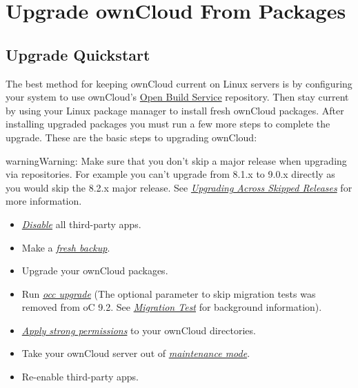 \documentclass[letterpaper,10pt,english]{sphinxmanual}
\begin{document}
\section{Upgrade ownCloud From Packages}
\label{maintenance/package_upgrade:upgrade-owncloud-from-packages}\label{maintenance/package_upgrade::doc}

\subsection{Upgrade Quickstart}
\label{maintenance/package_upgrade:upgrade-quickstart}
The best method for keeping ownCloud current on Linux servers is by configuring
your system to use ownCloud's \href{https://download.owncloud.org/download/repositories/stable/owncloud/}{Open Build Service} repository. Then stay
current by using your Linux package manager to install fresh ownCloud packages.
After installing upgraded packages you must run a few more steps to complete
the upgrade. These are the basic steps to upgrading ownCloud:

\begin{notice}{warning}{Warning:}
Make sure that you don't skip a major release when upgrading via repositories.
For example you can't upgrade from 8.1.x to 9.0.x directly as you would skip the 8.2.x
major release. See {\hyperref[maintenance/package_upgrade:skipped\string-release\string-upgrade\string-label]{\emph{Upgrading Across Skipped Releases}}} for more information.
\end{notice}
\begin{itemize}
\item {} 
{\hyperref[installation/apps_management_installation::doc]{\emph{\emph{Disable}}}} all third-party apps.

\item {} 
Make a {\hyperref[maintenance/backup::doc]{\emph{\emph{fresh backup}}}}.

\item {} 
Upgrade your ownCloud packages.

\item {} 
Run {\hyperref[configuration_server/occ_command:command\string-line\string-upgrade\string-label]{\emph{occ upgrade}}} (The optional parameter to skip migration
tests was removed from oC 9.2. See {\hyperref[maintenance/upgrade:migration\string-test\string-label]{\emph{Migration Test}}} for background information).

\item {} 
{\hyperref[installation/installation_wizard:strong\string-perms\string-label]{\emph{Apply strong permissions}}} to your ownCloud directories.

\item {} 
Take your ownCloud server out of {\hyperref[configuration_server/occ_command:maintenance\string-commands\string-label]{\emph{maintenance mode}}}.

\item {} 
Re-enable third-party apps.

\end{itemize}
\end{document}
